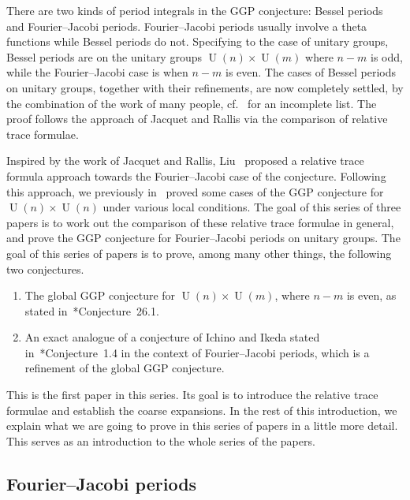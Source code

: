 \documentclass[letterpaper,11pt]{amsart}
\newcommand{\<}{\negthickspace}
\DeclareMathOperator{\U}{U}
\theoremstyle{definition}
\theoremstyle{plain}
\theoremstyle{remark}
\numberwithin{equation}{section}
\begin{document}
There are two kinds of period integrals in the GGP conjecture: Bessel periods
and Fourier--Jacobi periods. Fourier--Jacobi periods usually involve a theta
functions while Bessel periods do not. Specifying to the case of unitary
groups, Bessel periods are on the unitary groups $\U(n) \times \U(m)$ where
$n-m$ is odd, while the Fourier--Jacobi case is when $n-m$ is even. The
cases of Bessel periods on unitary groups, together with their refinements,
are now completely settled, by the combination of the work of many people,
cf.~\cites{JR,Yun,Zhang1,Zhang2,Xue3,BP,BP1,BPLZZ,BPCZ,BPC22} for an
incomplete list. The proof follows the approach of Jacquet and Rallis
via the comparison of relative trace formulae.

Inspired by the work of Jacquet and Rallis, Liu~\cite{Liu} proposed a
relative trace formula approach towards the Fourier--Jacobi case of the conjecture. Following
this approach, we previously in~\cites{Xue1,Xue2} proved some cases of the
GGP conjecture for $\U(n) \times \U(n)$ under various local conditions. The
goal of this series of three papers is to work out the comparison of these relative trace
formulae in general, and prove the GGP conjecture for Fourier--Jacobi periods
on unitary groups. The goal of this series of papers is to prove, among many other things, the following two conjectures.

\begin{enumerate}
\item The global GGP conjecture for $\U(n) \times \U(m)$, where $n-m$ is
    even, as stated in~\cite{GGP}*{Conjecture~26.1}.

\item An exact analogue of a conjecture of Ichino and Ikeda stated in~\cite{II}*{Conjecture~1.4} 
    in the context of Fourier--Jacobi periods, which is
    a refinement of the global GGP conjecture.
\end{enumerate}

This is the first paper in this series. Its goal is to introduce the relative trace formulae and establish the coarse expansions. In the rest of this introduction, we explain what we are going to prove in this series of papers in a little more detail. This serves as an introduction to the whole series of the papers.



\subsection{Fourier--Jacobi periods}
\end{document}

